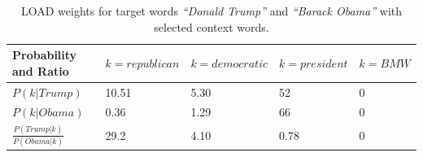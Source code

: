 \begin{table}[]
\centering

\begin{tabular}{@{}l|l|l|l|l@{}}
\toprule
Probability and Ratio&  $k=republican$& $k=democratic$ & $k=president$ &$k= BMW$  \\ \midrule
 $P(k|Trump)$& {\color[HTML]{CB0000}10.51} &  {\color[HTML]{329A9D}5.30} & {\color[HTML]{CB0000}52} & {\color[HTML]{329A9D}0} \\\midrule
  $P(k|Obama)$&{\color[HTML]{329A9D}0.36}  & {\color[HTML]{CB0000}1.29} &  {\color[HTML]{CB0000}66}&{\color[HTML]{329A9D}0}  \\\midrule
 $\frac { P(Trump|k) }{ P(Obama|k) } $& {\color[HTML]{CB0000}29.2} &  {\color[HTML]{329A9D}4.10}&  0.78 &    0  \\\midrule
\end{tabular}%

\caption{LOAD weights for target words \emph{``Donald Trump''} and \emph{``Barack Obama''} with selected context words. }
\label{table:tab_2}
\end{table}
\label{sec:components_load}

